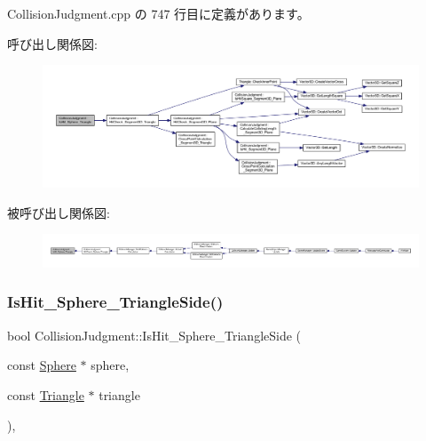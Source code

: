  Collision\+Judgment.\+cpp の 747 行目に定義があります。

呼び出し関係図\+:\nopagebreak
\begin{figure}[H]
\begin{center}
\leavevmode
\includegraphics[width=350pt]{class_collision_judgment_a3a594014c7ee4ba7adae21f2da9c7612_cgraph}
\end{center}
\end{figure}
被呼び出し関係図\+:
\nopagebreak
\begin{figure}[H]
\begin{center}
\leavevmode
\includegraphics[width=350pt]{class_collision_judgment_a3a594014c7ee4ba7adae21f2da9c7612_icgraph}
\end{center}
\end{figure}
\mbox{\label{class_collision_judgment_a1bd97fffa0335f66531ba624c3beccda}} 
\subsubsection{\texorpdfstring{Is\+Hit\+\_\+\+Sphere\+\_\+\+Triangle\+Side()}{IsHit\_Sphere\_TriangleSide()}}
{\footnotesize\ttfamily bool Collision\+Judgment\+::\+Is\+Hit\+\_\+\+Sphere\+\_\+\+Triangle\+Side (\begin{DoxyParamCaption}\item[{const \mbox{\hyperlink{class_sphere}{Sphere}} $\ast$}]{sphere,  }\item[{const \mbox{\hyperlink{class_triangle}{Triangle}} $\ast$}]{triangle }\end{DoxyParamCaption})\hspace{0.3cm}{\ttfamily [static]}, {\ttfamily [private]}}



